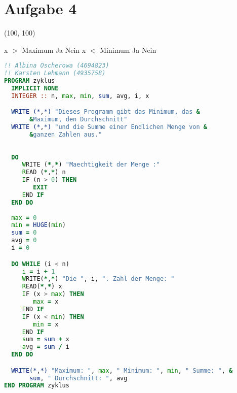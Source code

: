\documentclass{article}
\begin{document}
\section*{Aufgabe 4}

\begin{struktogramm}(100, 100)
  \untilend
  

     {x $>$ Maximum} {Ja} {Nein}
      \change
    \ifend
     {x $<$ Minimum} {Ja} {Nein}
      \change
    \ifend
  \whileend
\end{struktogramm}

\newpage
\begin{lstlisting}[language=Fortran, showstringspaces=false]
!! Albina Oscherowa (4694823)
!! Karsten Lehmann (4935758)
PROGRAM zyklus
  IMPLICIT NONE
  INTEGER :: n, max, min, sum, avg, i, x

  WRITE (*,*) "Dieses Programm gibt das Minimum, das &
       &Maximum, den Durchschnitt"
  WRITE (*,*) "und die Summe einer Endlichen Menge von &
       &ganzen Zahlen aus."
 
  
  DO
     WRITE (*,*) "Maechtigkeit der Menge :"
     READ (*,*) n
     IF (n > 0) THEN
        EXIT
     END IF
  END DO
  
  max = 0
  min = HUGE(min)
  sum = 0
  avg = 0
  i = 0

  DO WHILE (i < n)
     i = i + 1
     WRITE(*,*) "Die ", i, ". Zahl der Menge: "
     READ(*,*) x
     IF (x > max) THEN
        max = x
     END IF
     IF (x < min) THEN
        min = x
     END IF
     sum = sum + x
     avg = sum / i
  END DO

  WRITE(*,*) "Maximum: ", max, " Minimum: ", min, " Summe: ", &
       sum, " Durchschnitt: ", avg
END PROGRAM zyklus
\end{lstlisting}
\end{document}
